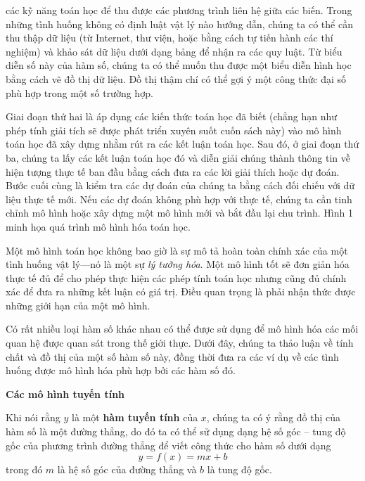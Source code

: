 \begin{minipage}[t]{0.708\textwidth}
    \fontsize{8.8pt}{11.5pt}\selectfont
    \noindent các kỹ năng toán học để thu được các phương trình liên hệ giữa các biến. Trong những tình huống không có định luật vật lý nào hướng dẫn, chúng ta có thể cần thu thập dữ liệu (từ Internet, thư viện, hoặc bằng cách tự tiến hành các thí nghiệm) và khảo sát dữ liệu dưới dạng bảng để nhận ra các quy luật. Từ biểu diễn số này của hàm số, chúng ta có thể muốn thu được một biểu diễn hình học bằng cách vẽ đồ thị dữ liệu. Đồ thị thậm chí có thể gợi ý một công thức đại số phù hợp trong một số trường hợp.

    Giai đoạn thứ hai là áp dụng các kiến thức toán học đã biết (chẳng hạn như phép tính giải tích sẽ được phát triển xuyên suốt cuốn sách này) vào mô hình toán học đã xây dựng nhằm rút ra các kết luận toán học. Sau đó, ở giai đoạn thứ ba, chúng ta lấy các kết luận toán học đó và diễn giải chúng thành thông tin về hiện tượng thực tế ban đầu bằng cách đưa ra các lời giải thích hoặc dự đoán. Bước cuối cùng là kiểm tra các dự đoán của chúng ta bằng cách đối chiếu với dữ liệu thực tế mới. Nếu các dự đoán không phù hợp với thực tế, chúng ta cần tinh chỉnh mô hình hoặc xây dựng một mô hình mới và bắt đầu lại chu trình. Hình 1 minh họa quá trình mô hình hóa toán học.

    \vspace{3pt}

    Một mô hình toán học không bao giờ là sự mô tả hoàn toàn chính xác của một tình huống vật lý—nó là một sự \textit{lý tưởng hóa}. Một mô hình tốt sẽ đơn giản hóa thực tế đủ để cho phép thực hiện các phép tính toán học nhưng cũng đủ chính xác để đưa ra những kết luận có giá trị. Điều quan trọng là phải nhận thức được những giới hạn của một mô hình.

    Có rất nhiều loại hàm số khác nhau có thể được sử dụng để mô hình hóa các mối quan hệ được quan sát trong thế giới thực. Dưới đây, chúng ta thảo luận về tính chất và đồ thị của một số hàm số này, đồng thời đưa ra các ví dụ về các tình huống được mô hình hóa phù hợp bởi các hàm số đó.

    \vspace{0.4em}
    \noindent{\color{stewartcyan}\rule{0.9ex}{0.9ex}}\hspace{0.5em}\textbf{\textsf{\large Các mô hình tuyến tính}}

    \vspace{0.3em}
    \noindent Khi nói rằng $y$ là một \textbf{hàm tuyến tính} của $x$, chúng ta có ý rằng đồ thị của hàm số là một đường thẳng, do đó ta có thể sử dụng dạng hệ số góc -- tung độ gốc của phương trình đường thẳng để viết công thức cho hàm số dưới dạng
    \[
    y = f(x) = mx + b
    \]
    trong đó $m$ là hệ số góc của đường thẳng và $b$ là tung độ gốc.


\end{minipage}
